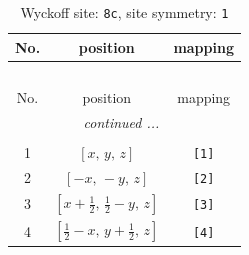 \documentclass[fleqn,8pt]{jsarticle}
\begin{document}
\renewcommand{\arraystretch}{1.2}
\begin{longtable}{ccc}
\caption{Wyckoff site: {\tt 8c}, site symmetry: {\tt 1}}
 \\
 \hline \hline
No. & position & mapping \\ \hline \endfirsthead

\multicolumn{2}{l}{\tablename\ \thetable{}} \\
 \hline \hline
No. & position & mapping \\ \hline \endhead

 \hline \hline
\multicolumn{2}{r}{\footnotesize\it continued ...} \\ \endfoot

 \hline \hline
\multicolumn{2}{r}{} \\ \endlastfoot

1 & $\left[ x,\, y,\, z \right]$ & {\tt [1]} \\ \hline
2 & $\left[ - x,\, - y,\, z \right]$ & {\tt [2]} \\ \hline
3 & $\left[ x + \frac{1}{2},\, \frac{1}{2} - y,\, z \right]$ & {\tt [3]} \\ \hline
4 & $\left[ \frac{1}{2} - x,\, y + \frac{1}{2},\, z \right]$ & {\tt [4]} \\
\end{longtable}
\end{document}
